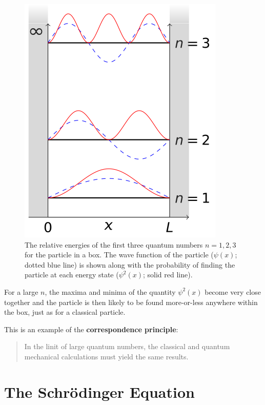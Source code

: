 \documentclass[
]{book}
\begin{document}
\begin{figure}

{\centering \includegraphics[width=0.7\linewidth]{visualisations/LaTeX/ch18-particleinbox123} 

}

\caption{The relative energies of the first three quantum numbers $n = 1, 2, 3$ for the particle in a box. The wave function of the particle ($\psi(x)$; dotted blue line) is shown along with the probability of finding the particle at each energy state ($\psi^2(x)$; solid red line). }\label{fig:ch17-partbox1}
\end{figure}

For a large \(n\), the maxima and minima of the quantity \(\psi^2(x)\) become very close together and the particle is then likely to be found more-or-less anywhere within the box, just as for a classical particle.

This is an example of the \textbf{correspondence principle}:

\begin{quote}
In the linit of large quantum numbers, the classical and quantum mechanical calculations must yield the same results.
\end{quote}

\hypertarget{sec:ch18-schrodinger}{%
\chapter{The Schrödinger Equation}\label{sec:ch18-schrodinger}}
\end{document}
